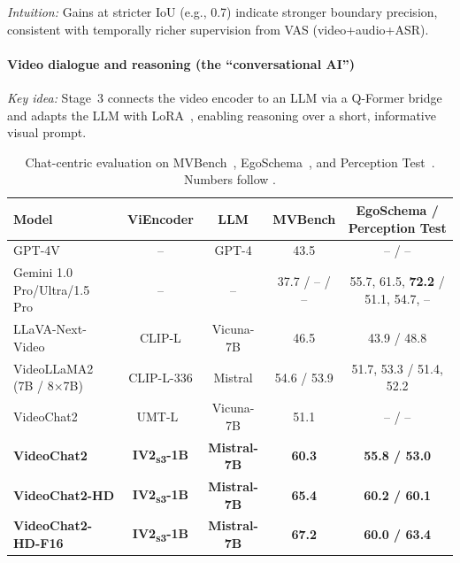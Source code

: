 \begin{enrichment}
\begin{enrichment}
        \noindent
        \emph{Intuition:} Gains at stricter IoU (e.g., 0.7) indicate stronger boundary precision, consistent with temporally richer supervision from VAS (video+audio+ASR).
        
        \paragraph{Video dialogue and reasoning (the ``conversational AI'')}
        \emph{Key idea:} Stage~3 connects the video encoder to an LLM via a Q-Former bridge and adapts the LLM with LoRA~\cite{hu2021_lora}, enabling reasoning over a short, informative visual prompt.
        
        \begin{table}[H]
            \centering
            \caption{Chat-centric evaluation on MVBench~\cite{li2024_mvbench}, EgoSchema~\cite{mangalam2023_egoschema}, and Perception Test~\cite{patraucean2023_perceptiontest}. Numbers follow \cite[Tab.~14]{wang2024_internvideo2}.}
            \label{tab:iv2_chat_compare}
            \scriptsize
            \begin{tabular}{lcccc}
                \hline
                \textbf{Model} & \textbf{ViEncoder} & \textbf{LLM} & \textbf{MVBench} & \textbf{EgoSchema / Perception Test} \\
                \hline
                GPT-4V~\cite{openai2023b_gpt4v} & -- & GPT-4 & 43.5 & -- / -- \\
                Gemini 1.0 Pro/Ultra/1.5 Pro~\cite{team2023_gemini} & -- & -- & 37.7 / -- / -- & 55.7, 61.5, \textbf{72.2} / 51.1, 54.7, -- \\
                LLaVA-Next-Video~\cite{liu2024_llava_next_video} & CLIP-L & Vicuna-7B & 46.5 & 43.9 / 48.8 \\
                VideoLLaMA2 (7B / 8$\times$7B)~\cite{cheng2024_videollama2} & CLIP-L-336 & Mistral & 54.6 / 53.9 & 51.7, 53.3 / 51.4, 52.2 \\
                VideoChat2~\cite{li2024_mvbench} & UMT-L~\cite{li2024_umt} & Vicuna-7B & 51.1 & -- / -- \\
                \hline
                \textbf{VideoChat2} & \textbf{IV2\textsubscript{s3}-1B} & \textbf{Mistral-7B} & \textbf{60.3} & \textbf{55.8 / 53.0} \\
                \textbf{VideoChat2-HD} & \textbf{IV2\textsubscript{s3}-1B} & \textbf{Mistral-7B} & \textbf{65.4} & \textbf{60.2 / 60.1} \\
                \textbf{VideoChat2-HD-F16} & \textbf{IV2\textsubscript{s3}-1B} & \textbf{Mistral-7B} & \textbf{67.2} & \textbf{60.0 / 63.4} \\
                \hline
            \end{tabular}
        \end{table}
        

\end{enrichment}
\end{enrichment}
